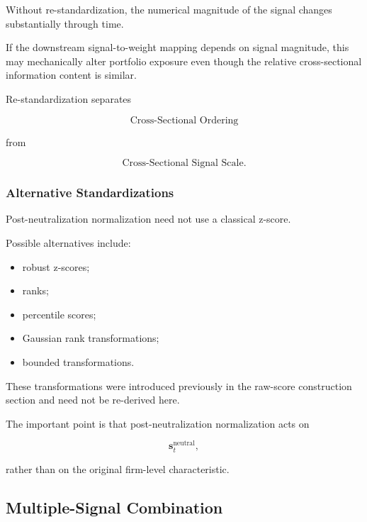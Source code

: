 \documentclass[11pt,a4paper]{article}
\begin{document}
Without re-standardization, the numerical magnitude of the signal changes
substantially through time.

If the downstream signal-to-weight mapping depends on signal magnitude, this
may mechanically alter portfolio exposure even though the relative
cross-sectional information content is similar.

Re-standardization separates

\begin{equation}
\boxed{
\text{Cross-Sectional Ordering}
}
\end{equation}

from

\begin{equation}
\boxed{
\text{Cross-Sectional Signal Scale}.
}
\end{equation}


\subsubsection{Alternative Standardizations}

Post-neutralization normalization need not use a classical z-score.

Possible alternatives include:

\begin{itemize}
    \item robust z-scores;
    \item ranks;
    \item percentile scores;
    \item Gaussian rank transformations;
    \item bounded transformations.
\end{itemize}

These transformations were introduced previously in the raw-score construction
section and need not be re-derived here.

The important point is that post-neutralization normalization acts on

\begin{equation}
\mathbf{s}_t^{\mathrm{neutral}},
\end{equation}

rather than on the original firm-level characteristic.


\subsection{Multiple-Signal Combination}
\label{subsec:multiple_signal_combination}
\end{document}
